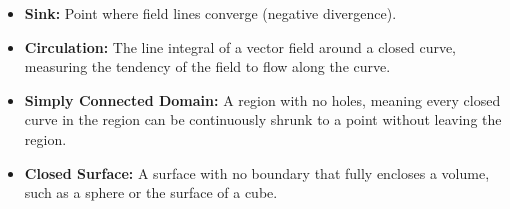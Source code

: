\begin{itemize}
    \item \textbf{Sink:} Point where field lines converge (negative divergence).

    \item \textbf{Circulation:} The line integral of a vector field around a closed curve, measuring the tendency of the field to flow along the curve.

    \item \textbf{Simply Connected Domain:} A region with no holes, meaning every closed curve in the region can be continuously shrunk to a point without leaving the region.

    \item \textbf{Closed Surface:} A surface with no boundary that fully encloses a volume, such as a sphere or the surface of a cube.
\end{itemize}

